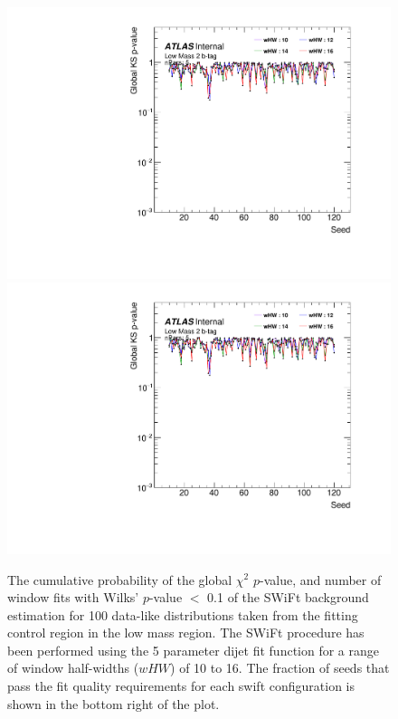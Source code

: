 \begin{figure}[!htb]
\captionsetup[subfigure]{aboveskip=0pt,justification=centering}
\centering
{} {
  \includegraphics[width=0.49\linewidth, angle=0,page=7]{figs/Dibjet/LowMass/FitStudy/windowSel_corrFitCR_dataLike_5para.pdf}
}  \hspace{-8mm}
 {
  \includegraphics[width=0.49\linewidth, angle=0,page=9]{figs/Dibjet/LowMass/FitStudy/windowSel_corrFitCR_dataLike_5para.pdf}
}
\vspace{10pt}
\caption{\label{fig:windowSel_dataLike}
  The cumulative probability of the global $\chi^{2}$ \mbox{$p$-value}, %
  and number of window fits with Wilks' \mbox{$p$-value} $<$ 0.1 of the SWiFt background estimation for
  100 data-like distributions taken from the fitting control region in the low mass region.
  The SWiFt procedure has been performed using the 5 parameter dijet fit function
  for a range of window half-widths ($wHW$) of 10 to 16.
  The fraction of seeds that pass the fit quality requirements for each swift configuration is shown in the bottom right of the plot.
}
\end{figure}

